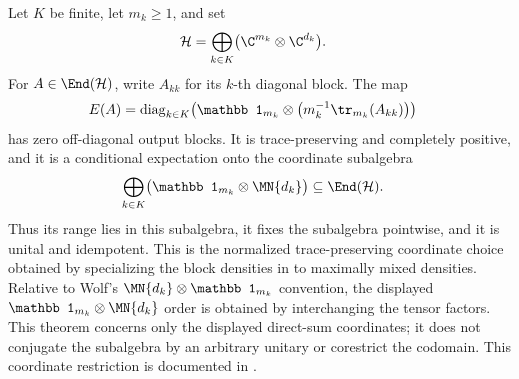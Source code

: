 \begin{theorem}
    \label{thm:coordinate_direct_sum_conditional_expectation}
    \leanok
    Let $K$ be finite, let $m_k\geq1$, and set
    \begin{align}
        \mathcal H
        &=\bigoplus_{k\in K}\bigl(\C^{m_k}\otimes\C^{d_k}\bigr).
        \notag
    \end{align}
    For $A\in\End(\mathcal H)$, write $A_{kk}$ for its $k$-th diagonal
    block. The map
    \begin{align}
        E(A)
        &=\operatorname{diag}_{k\in K}\!\left(
          \mathbb1_{m_k}\otimes
          \bigl(m_k^{-1}\tr_{m_k}(A_{kk})\bigr)\right)
        \notag
    \end{align}
    has zero off-diagonal output blocks. It is trace-preserving and completely
    positive, and it is a conditional expectation onto the coordinate
    subalgebra
    \begin{align}
        \bigoplus_{k\in K}
          \bigl(\mathbb1_{m_k}\otimes\MN{d_k}\bigr)
        &\subseteq\End(\mathcal H).
        \notag
    \end{align}
    Thus its range lies in this subalgebra, it fixes the subalgebra pointwise,
    and it is unital and idempotent. This is the normalized trace-preserving
    coordinate choice obtained by
    specializing the block densities in
    \cite[Proposition~1.5 and Equation~(1.40)]{Wolf2012Quantum} to maximally
    mixed densities. Relative to
    Wolf's $\MN{d_k}\otimes\mathbb1_{m_k}$ convention, the displayed
    $\mathbb1_{m_k}\otimes\MN{d_k}$ order is obtained by interchanging the
    tensor factors. This theorem concerns only the displayed direct-sum
    coordinates; it does not conjugate the subalgebra by an arbitrary unitary
    or corestrict the codomain. This coordinate restriction is documented in
    .
\end{theorem}

